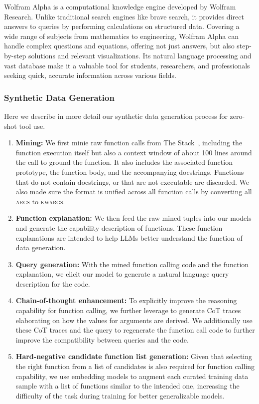 Wolfram Alpha is a computational knowledge engine developed by Wolfram Research. Unlike traditional search engines like brave search, it provides direct answers to queries by performing calculations on structured data. Covering a wide range of subjects from mathematics to engineering, Wolfram Alpha can handle complex questions and equations, offering not just answers, but also step-by-step solutions and relevant visualizations. Its natural language processing and vast database make it a valuable tool for students, researchers, and professionals seeking quick, accurate information across various fields.


\subsubsection{Synthetic Data Generation}\label{appendix:tools_synthetic_datagen}
Here we describe in more detail our synthetic data generation process for zero-shot tool use.
\begin{enumerate}
    \item \textbf{Mining:} We first minie raw function calls from The Stack~\citep{kocetkov2022stack3tbpermissively},  including the function execution itself but also a context window of about 100 lines around the call to ground the function. It also includes the associated function prototype, the function body, and the accompanying docstrings. Functions that do not contain docstrings, or that are not executable are discarded. We also made sure the format is unified across all function calls by converting all \textsc{args} to \textsc{kwargs}.

    \item \textbf{Function explanation:} We then feed the raw mined tuples into our \llamathree models
    and generate the capability description of functions. These function explanations are intended to help LLMs better understand the function of data generation.

    \item \textbf{Query generation:} With the mined function calling code and the function explanation,
    we elicit our \llamathree model to generate a natural language query description for the code.

    \item \textbf{Chain-of-thought enhancement:} To explicitly improve the reasoning capability for
    function calling, we further leverage \llamathree to generate CoT traces
    elaborating on how the values for arguments are derived. We additionally use these CoT
    traces and the query to regenerate the function call code to further improve the compatibility between queries and the code.

    \item \textbf{Hard-negative candidate function list generation:} Given that selecting the right function from a list of candidates is also required for function calling capability, we use embedding models to augment each curated training data sample with a list of functions similar to the intended one, increasing the difficulty of the task during training for better generalizable models.
\end{enumerate}

